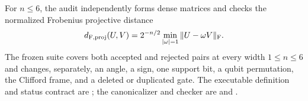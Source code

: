 For $n\leq6$, the audit independently forms dense matrices and checks the
normalized Frobenius projective distance
\begin{equation*}
 d_{\rm F,proj}(U,V)=2^{-n/2}\min_{|\omega|=1}\|U-\omega V\|_{\rm F}.
\end{equation*}
The frozen suite covers both accepted and rejected pairs at every width
$1\leq n\leq6$ and changes, separately, an angle, a sign, one support bit,
a qubit permutation, the Clifford frame, and a deleted or duplicated gate.
The executable definition and status contract are
; the canonicalizer and checker are
 and
.
